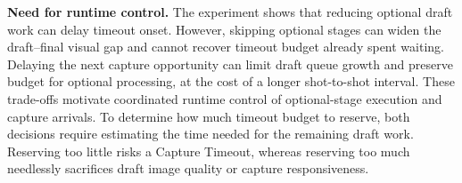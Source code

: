 \smallskip\noindent\textbf{Need for runtime control.}
The experiment shows that reducing optional draft work can delay timeout onset.
However, skipping optional stages can widen the draft--final visual gap and cannot recover timeout budget already spent waiting.
Delaying the next capture opportunity can limit draft queue growth and preserve budget for optional processing, at the cost of a longer shot-to-shot interval.
These trade-offs motivate coordinated runtime control of optional-stage execution and capture arrivals.
To determine how much timeout budget to reserve, both decisions require estimating the time needed for the remaining draft work.
Reserving too little risks a Capture Timeout, whereas reserving too much needlessly sacrifices draft image quality or capture responsiveness.
